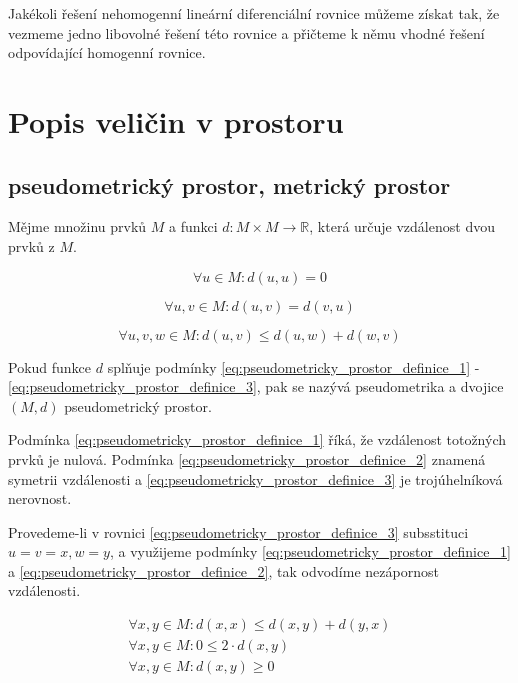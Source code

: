 \documentclass{book}
\begin{document}
\begin{fact}
Jakékoli řešení nehomogenní lineární diferenciální rovnice můžeme získat tak, že vezmeme jedno libovolné řešení této rovnice
a přičteme k němu vhodné řešení odpovídající homogenní rovnice.
\end{fact}

\chapter{Popis veličin v prostoru}

\section{pseudometrický prostor, metrický prostor}

Mějme množinu prvků \(M\) a funkci \(d: M \times M \rightarrow \mathbb{R}\), která určuje vzdálenost dvou prvků z \(M\).

\begin{equation}
\label{eq:pseudometricky_prostor_definice_1}
\forall u \in M : d(u, u) = 0
\end{equation}

\begin{equation}
\label{eq:pseudometricky_prostor_definice_2}
\forall u, v \in M : d(u, v) = d(v, u)
\end{equation}

\begin{equation}
\label{eq:pseudometricky_prostor_definice_3}
\forall u, v, w \in M : d(u, v) \leq d(u, w) + d(w, v)
\end{equation}

Pokud funkce \(d\) splňuje podmínky \eqref{eq:pseudometricky_prostor_definice_1} - \eqref{eq:pseudometricky_prostor_definice_3}, pak se nazývá pseudometrika a dvojice \((M, d)\) pseudometrický prostor.

Podmínka \eqref{eq:pseudometricky_prostor_definice_1} říká, že vzdálenost totožných prvků je nulová. Podmínka \eqref{eq:pseudometricky_prostor_definice_2} znamená symetrii vzdálenosti a \eqref{eq:pseudometricky_prostor_definice_3} je trojúhelníková nerovnost.

Provedeme-li v rovnici \eqref{eq:pseudometricky_prostor_definice_3} subsstituci \(u = v = x, w = y\), a využijeme podmínky \eqref{eq:pseudometricky_prostor_definice_1} a \eqref{eq:pseudometricky_prostor_definice_2},
tak odvodíme nezápornost vzdálenosti.

\begin{equation}
\begin{split}
\forall x, y \in M : d(x, x) \leq d(x, y) + d(y, x) \\
\forall x, y \in M : 0 \leq 2 \cdot d(x, y) \\
\forall x, y \in M : d(x, y) \geq 0
\end{split}
\end{equation}
\end{document}

